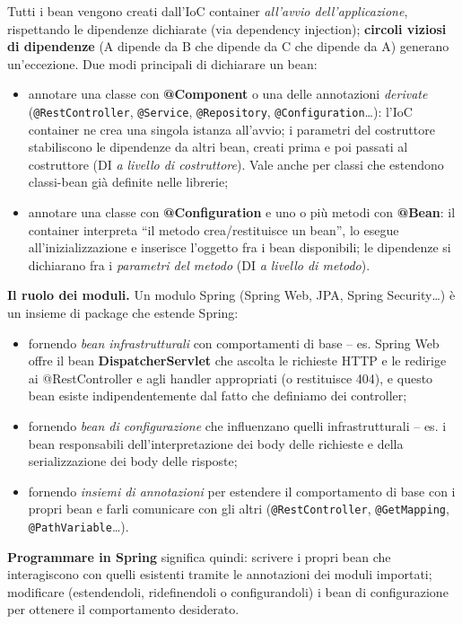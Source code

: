 Tutti i bean vengono creati dall'IoC container \emph{all'avvio dell'applicazione},
rispettando le dipendenze dichiarate (via dependency injection); \textbf{circoli viziosi di
dipendenze} (A dipende da B che dipende da C che dipende da A) generano un'eccezione.
Due modi principali di dichiarare un bean:
\begin{itemize}
  \item annotare una classe con \textbf{@Component} o una delle annotazioni \emph{derivate}
        (\texttt{@RestController}, \texttt{@Service}, \texttt{@Repository},
        \texttt{@Configuration}\dots): l'IoC container ne crea una singola istanza all'avvio;
        i parametri del costruttore stabiliscono le dipendenze da altri bean, creati prima e
        poi passati al costruttore (DI \emph{a livello di costruttore}). Vale anche per
        classi che estendono classi-bean gi\`a definite nelle librerie;
  \item annotare una classe con \textbf{@Configuration} e uno o pi\`u metodi con
        \textbf{@Bean}: il container interpreta ``il metodo crea/restituisce un bean'', lo
        esegue all'inizializzazione e inserisce l'oggetto fra i bean disponibili; le
        dipendenze si dichiarano fra i \emph{parametri del metodo} (DI \emph{a livello di
        metodo}).
\end{itemize}

\textbf{Il ruolo dei moduli.} Un modulo Spring (Spring Web, JPA, Spring Security\dots) \`e un
insieme di package che estende Spring:
\begin{itemize}
  \item fornendo \emph{bean infrastrutturali} con comportamenti di base -- es. Spring Web
        offre il bean \textbf{DispatcherServlet} che ascolta le richieste HTTP e le redirige
        ai @RestController e agli handler appropriati (o restituisce 404), e questo bean
        esiste indipendentemente dal fatto che definiamo dei controller;
  \item fornendo \emph{bean di configurazione} che influenzano quelli infrastrutturali --
        es. i bean responsabili dell'interpretazione dei body delle richieste e della
        serializzazione dei body delle risposte;
  \item fornendo \emph{insiemi di annotazioni} per estendere il comportamento di base con i
        propri bean e farli comunicare con gli altri (\texttt{@RestController},
        \texttt{@GetMapping}, \texttt{@PathVariable}\dots).
\end{itemize}
\textbf{Programmare in Spring} significa quindi: scrivere i propri bean che interagiscono con
quelli esistenti tramite le annotazioni dei moduli importati; modificare (estendendoli,
ridefinendoli o configurandoli) i bean di configurazione per ottenere il comportamento
desiderato.

